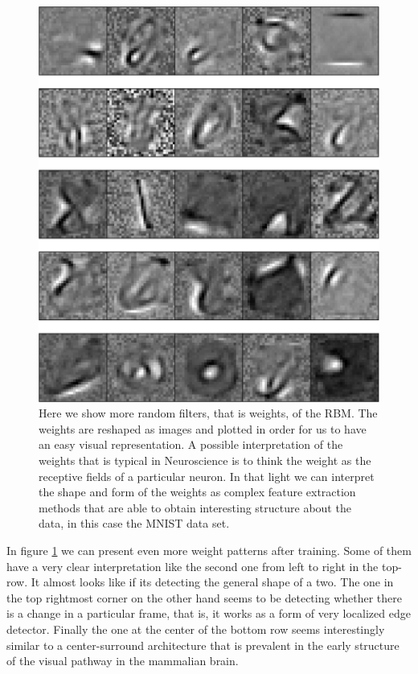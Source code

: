 \documentclass[11pt,a4paper]{article}
\begin{document}
\begin{center}
\begin{figure}[H]
\centering
\includegraphics[scale=.45]{final_filters1.pdf} 
\caption{Here we show more random filters, that is weights, of the RBM. The weights are reshaped as images and plotted in order for us to have an easy visual representation. A possible interpretation of the weights that is typical in Neuroscience is to think the weight as the receptive fields of a particular neuron. In that light we can interpret the shape and form of the weights as complex feature extraction methods that are able to obtain interesting structure about the data, in this case the MNIST data set.}
\label{fig:rbm_filters1}
\end{figure} 
\end{center}

In figure \ref{fig:rbm_filters1} we can present even more weight patterns after training. Some of them have a very clear interpretation like the second one from left to right in the top-row. It almost looks like if its detecting the general shape of a two. The one in the top rightmost corner on the other hand seems to be detecting whether there is a change in a particular frame, that is, it works as a form of very localized edge detector. Finally  the one at the center of the bottom row seems interestingly similar to a center-surround architecture that is prevalent in the early structure of the visual pathway in the mammalian brain. 
\end{document}
